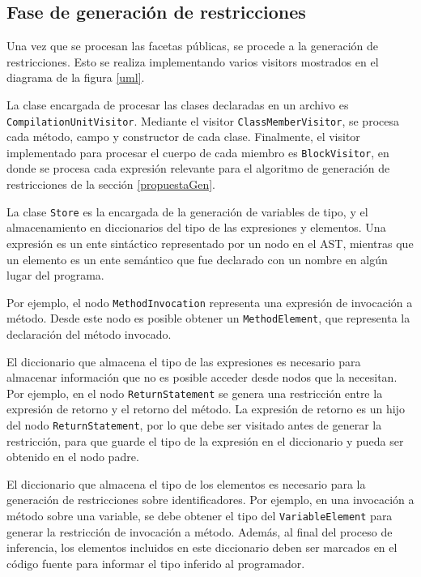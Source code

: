 \subsection{Fase de generación de restricciones}
Una vez que se procesan las facetas públicas, se procede a la generación de restricciones. Esto se realiza implementando varios visitors mostrados en el diagrama de la figura \ref{uml}.

La clase encargada de procesar las clases declaradas en un archivo es \texttt{CompilationUnitVisitor}. Mediante el visitor \texttt{ClassMemberVisitor}, se procesa cada método, campo y constructor de cada clase. Finalmente, el visitor implementado para procesar el cuerpo de cada miembro es \texttt{BlockVisitor}, en donde se procesa cada expresión relevante para el algoritmo de generación de restricciones de la sección \ref{propuestaGen}.

La clase \texttt{Store} es la encargada de la generación de variables de tipo, y el almacenamiento en diccionarios del tipo de las expresiones y elementos. Una expresión es un ente sintáctico representado por un nodo en el AST, mientras que un elemento es un ente semántico que fue declarado con un nombre en algún lugar del programa.

Por ejemplo, el nodo \texttt{MethodInvocation} representa una expresión de invocación a método. Desde este nodo es posible obtener un \texttt{MethodElement}, que representa la declaración del método invocado.

El diccionario que almacena el tipo de las expresiones es necesario para almacenar información que no es posible acceder desde nodos que la necesitan. Por ejemplo, en el nodo \texttt{ReturnStatement} se genera una restricción entre la expresión de retorno y el retorno del método. La expresión de retorno es un hijo del nodo \texttt{ReturnStatement}, por lo que debe ser visitado antes de generar la restricción, para que guarde el tipo de la expresión en el diccionario y pueda ser obtenido en el nodo padre.

El diccionario que almacena el tipo de los elementos es necesario para la generación de restricciones sobre identificadores. Por ejemplo, en una invocación a método sobre una variable, se debe obtener el tipo del \texttt{VariableElement} para generar la restricción de invocación a método. Además, al final del proceso de inferencia, los elementos incluidos en este diccionario deben ser marcados en el código fuente para informar el tipo inferido al programador.

